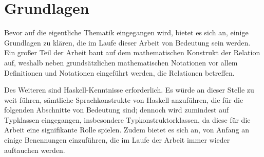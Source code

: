 \section{Grundlagen}

\label{sec:grundlagen}

Bevor auf die eigentliche Thematik eingegangen wird, bietet es sich an, einige Grundlagen zu klären, die im Laufe dieser Arbeit
von Bedeutung sein werden. Ein großer Teil der Arbeit baut auf dem mathematischen Konstrukt der Relation auf, weshalb neben
grundsätzlichen mathematischen Notationen vor allem Definitionen und Notationen eingeführt werden, die Relationen betreffen.

Des Weiteren sind Haskell-Kenntnisse erforderlich. Es würde an dieser Stelle zu weit führen, sämtliche Sprachkonstrukte von
Haskell anzuführen, die für die folgenden Abschnitte von Bedeutung sind; dennoch wird zumindest auf Typklassen eingegangen, insbesondere Typkonstruktorklassen,
da diese für die Arbeit eine signifikante Rolle spielen. Zudem bietet es sich an, von Anfang an einige Benennungen einzuführen, die im Laufe der
Arbeit immer wieder auftauchen werden.





